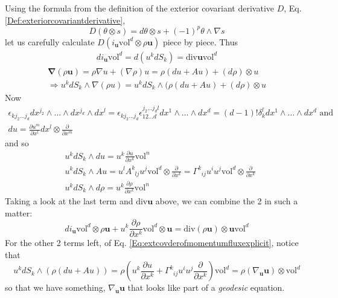 \documentclass[twoside,landscape,10pt]{amsart}
\theoremstyle{plain}
\theoremstyle{definition}
\theoremstyle{remark}
\theoremstyle{remark}
\begin{document}
\begin{multicols*}{2}
Using the formula from the definition of the exterior covariant derivative $D$, Eq. \ref{Def:exteriorcovariantderivative}, 
\[
D(\theta \otimes s) = d\theta \otimes s + (-1)^p \theta \wedge \nabla s
\]
let us carefully calculate $D(i_{\mathbf{u}} \text{vol}^d \otimes \rho \mathbf{u})$ piece by piece.  Thus
\[
\begin{gathered}
  di_{\mathbf{u}} \text{vol}^d = d(u^k dS_k) = \text{div}\mathbf{u} \text{vol}^d
\end{gathered}
\]
\[
\begin{gathered}
  \mathbf{\nabla} (\rho \mathbf{u}) = \rho \nabla u + (\nabla \rho) u = \rho (du + Au) + (d\rho)\otimes u \\
  \Longrightarrow u^k dS_k \wedge \nabla (\rho u) = u^k dS_k \wedge (\rho (du+Au) + (d\rho)\otimes u
\end{gathered}
\]
Now
\[
\begin{gathered}
\epsilon_{kj_2 \dots j_d} dx^{j_2} \wedge \dots \wedge dx^{j_d} \wedge dx^l = \epsilon_{kj_2 \dots j_d} \epsilon^{j_2 \dots j_d l }_{ 12 \dots d} dx^1 \wedge \dots \wedge dx^d = (d-1)! \delta_k^l dx^1 \wedge \dots \wedge dx^d \text{ and } \\
du = \frac{ \partial u^m }{ \partial x^l} dx^l \otimes \frac{ \partial }{ \partial x^m}
\end{gathered}
\]
and so 
\begin{equation}\label{Eq:extcovderofmomentumfluxexplicit}
\begin{aligned}
  & u^k dS_k \wedge du = u^k \frac{ \partial u}{ \partial x^k} \text{vol}^n \\ 
  & u^k dS_k \wedge Au = u^l A^k_{ \; \; lj} u^j \text{vol}^d \otimes \frac{ \partial }{ \partial x^k} = \Gamma^k_{ \; \; ij } u^i u^j \text{vol}^d \otimes \frac{ \partial }{ \partial x^k} \\ 
  & u^k dS_k \wedge d\rho = u^k \frac{ \partial \rho }{ \partial x^k} \text{vol}^n 
\end{aligned}
\end{equation}
Taking a look at the last term and $\text{div}\mathbf{u}$ above, we can combine the 2 in such a matter:
\[
di_{\mathbf{u}} \text{vol}^d \otimes \rho \mathbf{u} + u^k \frac{ \partial \rho }{ \partial x^k} \text{vol}^d \otimes \mathbf{u} = \text{div}(\rho \mathbf{u}) \otimes \mathbf{u} \text{vol}^d
\]
For the other 2 terms left, of Eq. \ref{Eq:extcovderofmomentumfluxexplicit}, notice that 
\[
u^k dS_k \wedge ( \rho (du + Au)) = \rho (u^k \frac{ \partial u}{ \partial x^k} + \Gamma^k_{ \; \; ij} u^i u^j \frac{ \partial }{ \partial x^k}) \text{vol}^d = \rho ( \nabla_{\mathbf{u}} \mathbf{u}) \otimes \text{vol}^d
\]
so that we have something, $\nabla_{\mathbf{u}} \mathbf{u}$ that looks like part of a \emph{geodesic} equation.  


\end{multicols*}
\end{document}
